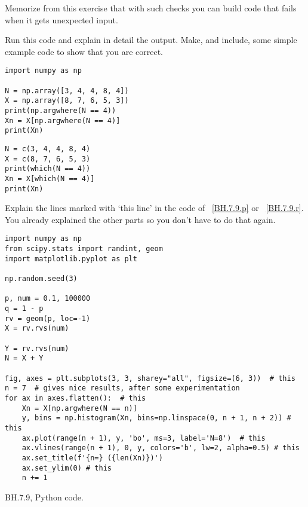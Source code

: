 Memorize from this exercise that with such checks you can build code that fails when it gets unexpected input.


\begin{exercise}
Run this code and explain in detail the output. Make, and include, some simple example code to show that you are correct.

\begin{verbatim}
import numpy as np

N = np.array([3, 4, 4, 8, 4])
X = np.array([8, 7, 6, 5, 3])
print(np.argwhere(N == 4))
Xn = X[np.argwhere(N == 4)]
print(Xn)
\end{verbatim}

\begin{verbatim}
N = c(3, 4, 4, 8, 4)
X = c(8, 7, 6, 5, 3)
print(which(N == 4))
Xn = X[which(N == 4)]
print(Xn)
\end{verbatim}
\end{exercise}

\begin{exercise}
Explain the lines marked with `this line' in the code of ~\cref{BH.7.9.p} or ~\cref{BH.7.9.r}. You already explained the other parts so you don't have to do that again.
\end{exercise}


\begin{listing}[!ht]
\begin{verbatim}
import numpy as np
from scipy.stats import randint, geom
import matplotlib.pyplot as plt

np.random.seed(3)

p, num = 0.1, 100000
q = 1 - p
rv = geom(p, loc=-1)
X = rv.rvs(num)

Y = rv.rvs(num)
N = X + Y

fig, axes = plt.subplots(3, 3, sharey="all", figsize=(6, 3))  # this
n = 7  # gives nice results, after some experimentation
for ax in axes.flatten():  # this
    Xn = X[np.argwhere(N == n)]
    y, bins = np.histogram(Xn, bins=np.linspace(0, n + 1, n + 2)) # this
    ax.plot(range(n + 1), y, 'bo', ms=3, label='N=8')  # this
    ax.vlines(range(n + 1), 0, y, colors='b', lw=2, alpha=0.5) # this
    ax.set_title(f'{n=} ({len(Xn)})')
    ax.set_ylim(0) # this
    n += 1
\end{verbatim}
\caption{BH.7.9, Python code.}
\label{BH.7.9.p}
\end{listing}


